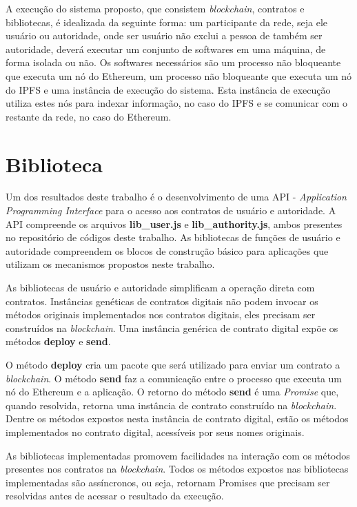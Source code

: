 \documentclass[tcc,capa]{texufpel}
\begin{document}
    A execução do sistema proposto, que consistem \textit{blockchain}, contratos e bibliotecas, é idealizada da seguinte forma: um participante da rede, seja ele usuário ou autoridade, onde ser usuário não exclui a pessoa de também ser autoridade, deverá executar um conjunto de softwares em uma máquina, de forma isolada ou não. Os softwares necessários são um processo não bloqueante que executa um nó do Ethereum, um processo não bloqueante que executa um nó do IPFS e uma instância de execução do sistema. Esta instância de execução utiliza estes nós para indexar informação, no caso do IPFS e se comunicar com o restante da rede, no caso do Ethereum.
    
    \section{Biblioteca}
    
    Um dos resultados deste trabalho é o desenvolvimento de uma API - \textit{Application Programming Interface} para o acesso aos contratos de usuário e autoridade. A API compreende os arquivos \textbf{lib\_user.js} e \textbf{lib\_authority.js}, ambos presentes no repositório de códigos deste trabalho. As bibliotecas de funções de usuário e autoridade compreendem os blocos de construção básico para aplicações que utilizam os mecanismos propostos neste trabalho.
    
    As bibliotecas de usuário e autoridade simplificam a operação direta com contratos. Instâncias genéticas de contratos digitais não podem invocar os métodos originais implementados nos contratos digitais, eles precisam ser construídos na \textit{blockchain}. Uma instância genérica de contrato digital expõe os métodos \textbf{deploy} e \textbf{send}.
    
    O método \textbf{deploy} cria um pacote que será utilizado para enviar um contrato a \textit{blockchain}. O método \textbf{send} faz a comunicação entre o processo que executa um nó do Ethereum e a aplicação. O retorno do método \textbf{send} é uma \textit{Promise} que, quando resolvida, retorna uma instância de contrato construído na \textit{blockchain}. Dentre os métodos expostos nesta instância de contrato digital, estão os métodos implementados no contrato digital, acessíveis por seus nomes originais.
    
    As bibliotecas implementadas promovem facilidades na interação com os métodos presentes nos contratos na \textit{blockchain}. Todos os métodos expostos nas bibliotecas implementadas são assíncronos, ou seja, retornam Promises que precisam ser resolvidas antes de acessar o resultado da execução.
    
\end{document}
